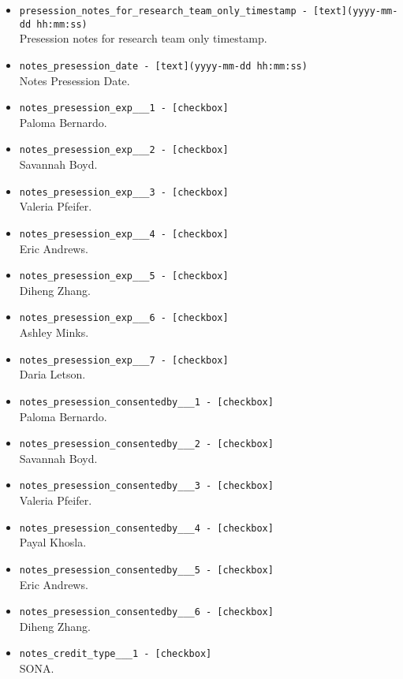 \begin{description}
\begin{addmargin}[0em]{0em}
\begin{addmargin}[1em]{0em}
\begin{itemize}
            \item \verb|presession_notes_for_research_team_only_timestamp - [text](yyyy-mm-dd hh:mm:ss)|\\Presession notes for research team only timestamp.
            \item \verb|notes_presession_date - [text](yyyy-mm-dd hh:mm:ss)|\\Notes Presession Date.
            \item \verb|notes_presession_exp___1 - [checkbox]|\\Paloma Bernardo.
            \item \verb|notes_presession_exp___2 - [checkbox]|\\Savannah Boyd.
            \item \verb|notes_presession_exp___3 - [checkbox]|\\Valeria Pfeifer.
            \item \verb|notes_presession_exp___4 - [checkbox]|\\Eric Andrews.
            \item \verb|notes_presession_exp___5 - [checkbox]|\\Diheng Zhang.
            \item \verb|notes_presession_exp___6 - [checkbox]|\\Ashley Minks.
            \item \verb|notes_presession_exp___7 - [checkbox]|\\Daria Letson.
            \item \verb|notes_presession_consentedby___1 - [checkbox]|\\Paloma Bernardo.
            \item \verb|notes_presession_consentedby___2 - [checkbox]|\\Savannah Boyd.
            \item \verb|notes_presession_consentedby___3 - [checkbox]|\\Valeria Pfeifer.
            \item \verb|notes_presession_consentedby___4 - [checkbox]|\\Payal Khosla.
            \item \verb|notes_presession_consentedby___5 - [checkbox]|\\Eric Andrews.
            \item \verb|notes_presession_consentedby___6 - [checkbox]|\\Diheng Zhang.
            \item \verb|notes_credit_type___1 - [checkbox]|\\SONA.

\end{itemize}
\end{addmargin}
\end{addmargin}
\end{description}
